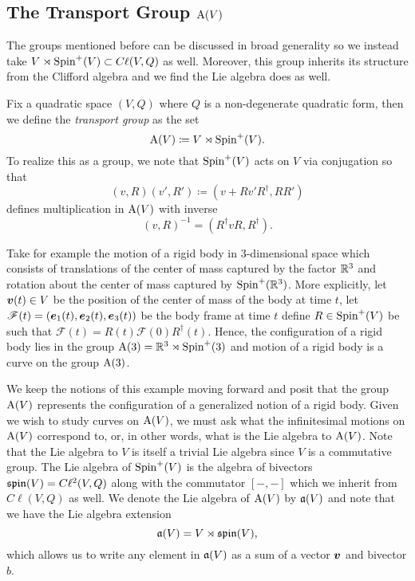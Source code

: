 \documentclass[conf]{new-aiaa}
\begin{document}
\subsection{The Transport Group $\operatorname{A}(V)$}

The groups mentioned before can be discussed in broad generality so we instead take $V\rtimes \operatorname{Spin}^+(V) \subset C\ell(V,Q)$ as well. Moreover, this group inherits its structure from the Clifford algebra and we find the Lie algebra does as well. 

\begin{definition}
Fix a quadratic space $(V,Q)$ where $Q$ is a non-degenerate quadratic form, then we define the \emph{transport group} as the set
\begin{equation}
\operatorname{A}(V)\coloneqq V\rtimes \operatorname{Spin}^+(V).
\end{equation}
To realize this as a group, we note that $\operatorname{Spin}^+(V)$ acts on $V$ via conjugation so that
\begin{equation}
\label{eq:product_in_A}
(v,R)(v',R')\coloneqq(v+Rv'R^\dagger, RR')
\end{equation}
defines multiplication in $\operatorname{A}(V)$ with inverse
\begin{equation}
(v,R)^{-1} = (R^\dagger v R, R^\dagger).
\end{equation}
\end{definition}

\begin{example}
Take for example the motion of a rigid body in 3-dimensional space which consists of translations of the center of mass captured by the factor $\mathbb{R}^3$ and rotation about the center of mass captured by $\operatorname{Spin}^+(\mathbb{R}^3)$. More explicitly, let $\boldsymbol{v}(t) \in V$ be the position of the center of mass of the body at time $t$, let $\mathscr{F}(t)=(\boldsymbol{e}_1(t),\boldsymbol{e}_2(t),\boldsymbol{e}_3(t))$ be the body frame at time $t$ define $R \in \operatorname{Spin}^+(V)$ be such that $\mathscr{F}(t)=R(t)\mathscr{F}(0)R^\dagger(t)$. Hence, the configuration of a rigid body lies in the group $\operatorname{A}(3)=\mathbb{R}^3 \rtimes \operatorname{Spin}^+(3)$ and motion of a rigid body is a curve on the group $\operatorname{A}(3)$.
\end{example}

We keep the notions of this example moving forward and posit that the group $\operatorname{A}(V)$ represents the configuration of a generalized notion of a rigid body. Given we wish to study curves on $\operatorname{A}(V)$, we must ask what the infinitesimal motions on $\operatorname{A}(V)$ correspond to, or, in other words, what is the Lie algebra to $\operatorname{A}(V)$. Note that the Lie algebra to $V$ is itself a trivial Lie algebra since $V$ is a commutative group. The Lie algebra of $\operatorname{Spin}^+(V)$ is the algebra of bivectors $\mathfrak{spin}(V)=C\ell^2(V,Q)$ along with the commutator $[-,-]$ which we inherit from $C\ell(V,Q)$ as well. We denote the Lie algebra of $\operatorname{A}(V)$ by $\mathfrak{a}(V)$ and note that we have the Lie algebra extension
\begin{equation}
\label{eq:extension}
\mathfrak{a}(V)=V\rtimes\mathfrak{spin}(V),
\end{equation}
which allows us to write any element in $\mathfrak{a}(V)$ as a sum of a vector $\boldsymbol{v}$ and bivector $b$. 
\end{document}
